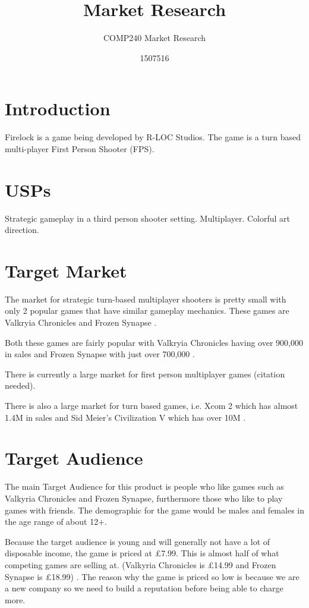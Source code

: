 \documentclass{scrartcl}
\title{Market Research}
\subtitle{COMP240 Market Research}
\author{1507516}
\begin{document}
\maketitle


\section{Introduction}
Firelock is a game being developed by R-LOC Studios. The game is a turn based multi-player First Person Shooter (FPS).

\section{USPs}
Strategic gameplay in a third person shooter setting.
Multiplayer.
Colorful art direction.

\section{Target Market}
The market for strategic turn-based multiplayer shooters is pretty small with only 2 popular games that have similar gameplay mechanics.
These games are Valkryia Chronicles and Frozen Synapse \cite{Valkyria, Frozen}.

 Both these games are fairly popular with Valkryia Chronicles having over 900,000\cite{Valkyria} in sales and Frozen Synapse with just over 700,000 \cite{Frozen}.
 
 There is currently a large market for first person multiplayer games (citation needed).

There is also a large market for turn based games, i.e. Xcom 2\cite{xcom} which has almost 1.4M in sales and Sid Meier's Civilization V which has over 10M \cite{civV}. 


\section{Target Audience}
The main Target Audience for this product is people who like games such as Valkyria Chronicles and Frozen Synapse, furthermore those who like to play games with friends.
The demographic for the game would be males and females in the age range of about 12+.

Because the target audience is young and will generally not have a lot of disposable income, the game is priced at \pounds 7.99. This is almost half of what competing games are selling at. (Valkyria Chronicles is \pounds 14.99 and Frozen Synapse is \pounds 18.99) \cite{Valkyria, Frozen}. The reason why the game is priced so low is because we are a new company so we need to build a reputation before being able to charge more.
\end{document}
